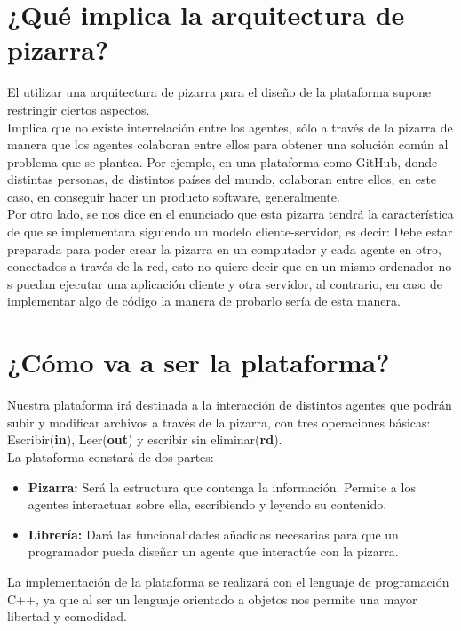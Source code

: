 \section{¿Qué implica la arquitectura de pizarra?}
El utilizar una arquitectura de pizarra para el diseño de la plataforma supone restringir ciertos aspectos.\\

Implica que no existe interrelación entre los agentes, sólo a través de la pizarra de manera que los agentes colaboran entre ellos para obtener una solución común al problema que se plantea. Por ejemplo, en una plataforma como GitHub, donde distintas personas, de distintos países del mundo, colaboran entre ellos, en este caso, en conseguir hacer un producto software, generalmente.\\

Por otro lado, se nos dice en el enunciado que esta pizarra tendrá la característica de que se implementara siguiendo un modelo cliente-servidor, es decir: Debe estar preparada para poder crear la pizarra en un computador y cada agente en otro, conectados a través de la red, esto no quiere decir que en un mismo ordenador no s puedan ejecutar una aplicación cliente y otra servidor, al contrario, en caso de implementar algo de código la manera de probarlo sería de esta manera.

\section{¿Cómo va a ser la plataforma?}
Nuestra plataforma irá destinada a la interacción de distintos agentes que podrán subir y modificar archivos a través de la pizarra, con tres operaciones básicas: Escribir(\textbf{in}), Leer(\textbf{out}) y escribir sin eliminar(\textbf{rd}).\\

La plataforma constará de dos partes:
\begin{itemize}
	\item \textbf{Pizarra: }Será la estructura que contenga la información. Permite a los agentes interactuar sobre ella, escribiendo y leyendo su contenido.
	\item \textbf{Librería: }Dará las funcionalidades añadidas necesarias para que un programador pueda diseñar un agente que interactúe con la pizarra. 
\end{itemize}

La implementación de la plataforma se realizará con el lenguaje de programación C++, ya que al ser un lenguaje orientado a objetos nos permite una mayor libertad y comodidad.
